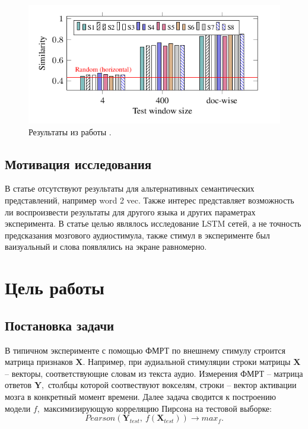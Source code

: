 \documentclass[pdftex,ptm,12pt,a4paper]{report}
\theoremstyle{definition}
\begin{document}
\begin{figure}[h]
\includegraphics[scale=0.7]{images/neural_nets.png}
\centering
\caption{Результаты из работы \cite{qian2016bridging}.}
\label{qian_res}
\end{figure}

\section{Мотивация исследования}

В статье \cite{hanke2014high} отсутствуют результаты для альтернативных семантических представлений, например word 2 vec. Также интерес представляет возможность ли воспроизвести результаты для другого языка и других параметрах эксперимента.
В статье \cite{qian2016bridging} целью являлось исследование LSTM сетей, а не точность предсказания мозгового аудиостимула, также стимул в эксперименте был ваизуальный и слова появлялись на экране равномерно.

\chapter{Цель работы}

\section{Постановка задачи}

В типичном эксперименте с помощью ФМРТ по внешнему стимулу строится матрица признаков $\textbf{X}.$ Например, при аудиальной стимуляции строки матрицы $\textbf{X}$ -- векторы, соответствующие словам из текста аудио. Измерения ФМРТ -- матрица ответов $\textbf{Y},$ столбцы которой соотвествуют вокселям, строки -- вектор активации мозга в конкретный момент времени. Далее задача сводится к построению модели $f,$ максимизирующую корреляцию Пирсона на тестовой выборке:
$$Pearson(\textbf{Y}_{test},\ f(\textbf{X}_{test})) \rightarrow max_{f}.$$
\end{document}

